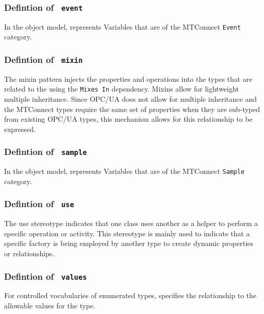 \FloatBarrier
\subsubsection{Defintion of \texttt{ event}} \label{type:event}

\FloatBarrier

In the object model, represents Variables that are of the MTConnect \texttt{Event} category.

\FloatBarrier
\subsubsection{Defintion of \texttt{ mixin}} \label{type:mixin}

\FloatBarrier

The mixin pattern injects the properties and operations into the types 
that are related to the using the \texttt{Mixes In} dependency. Mixins allow for
lightweight multiple inheritance. Since OPC/UA does not allow for multiple inheritance 
and the MTConnect  types require the same set of properties when they are sub-typed
from existing OPC/UA types, this mechanism allows for this relationship to be expressed.


\FloatBarrier
\subsubsection{Defintion of \texttt{ sample}} \label{type:sample}

\FloatBarrier

In the object model, represents Variables that are of the MTConnect \texttt{Sample} category.

\FloatBarrier
\subsubsection{Defintion of \texttt{ use}} \label{type:use}

\FloatBarrier

The use stereotype indicates that one class uses another as a helper to perform 
a specific operation or activity. This stereotype is mainly used to indicate
that a specific factory is being employed by another type to create dynamic
properties or relationships.

\FloatBarrier
\subsubsection{Defintion of \texttt{ values}} \label{type:values}

\FloatBarrier

For controlled vocabularies of enumerated types, specifies the relationship to the allowable 
values for the type.

\FloatBarrier
